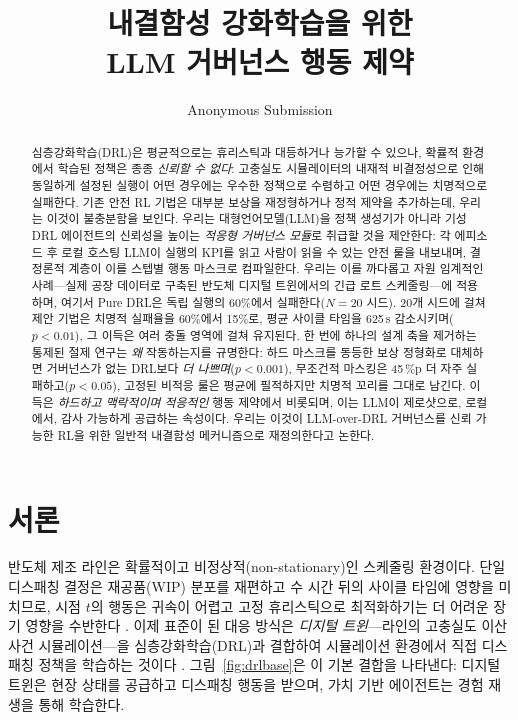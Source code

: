 \documentclass[letterpaper]{article} %
\title{내결함성 강화학습을 위한\\
LLM 거버넌스 행동 제약}
\author{
    Anonymous Submission
}
\begin{document}
\maketitle

\begin{abstract}
심층강화학습(DRL)은 평균적으로는 휴리스틱과 대등하거나 능가할 수 있으나, 확률적
환경에서 학습된 정책은 종종 \emph{신뢰할 수 없다}: 고충실도 시뮬레이터의 내재적
비결정성으로 인해 동일하게 설정된 실행이 어떤 경우에는 우수한 정책으로 수렴하고 어떤
경우에는 치명적으로 실패한다. 기존 안전 RL 기법은 대부분 보상을 재정형하거나 정적
제약을 추가하는데, 우리는 이것이 불충분함을 보인다. 우리는 대형언어모델(LLM)을 정책
생성기가 아니라 기성 DRL 에이전트의 신뢰성을 높이는 \emph{적응형 거버넌스 모듈}로
취급할 것을 제안한다: 각 에피소드 후 로컬 호스팅 LLM이 실행의 KPI를 읽고 사람이 읽을
수 있는 안전 룰을 내보내며, 결정론적 계층이 이를 스텝별 행동 마스크로 컴파일한다.
우리는 이를 까다롭고 자원 임계적인 사례---실제 공장 데이터로 구축된 반도체 디지털
트윈에서의 긴급 로트 스케줄링---에 적용하며, 여기서 Pure DRL은 독립 실행의 60\%에서
실패한다($N{=}20$ 시드). 20개 시드에 걸쳐 제안 기법은 치명적 실패율을 60\%에서
15\%로, 평균 사이클 타임을 625\,s 감소시키며($p{<}0.01$), 그 이득은 여러 충돌 영역에
걸쳐 유지된다. 한 번에 하나의 설계 축을 제거하는 통제된 절제 연구는 \emph{왜}
작동하는지를 규명한다: 하드 마스크를 동등한 보상 정형화로 대체하면 거버넌스가 없는
DRL보다 \emph{더 나쁘며}($p{<}0.001$), 무조건적 마스킹은 45\,\%p 더 자주
실패하고($p{<}0.05$), 고정된 비적응 룰은 평균에 필적하지만 치명적 꼬리를 그대로
남긴다. 이득은 \emph{하드하고 맥락적이며 적응적인} 행동 제약에서 비롯되며, 이는 LLM이
제로샷으로, 로컬에서, 감사 가능하게 공급하는 속성이다. 우리는 이것이 LLM-over-DRL
거버넌스를 신뢰 가능한 RL을 위한 일반적 내결함성 메커니즘으로 재정의한다고 논한다.
\end{abstract}

\section{서론}

반도체 제조 라인은 확률적이고 비정상적(non-stationary)인 스케줄링 환경이다. 단일
디스패칭 결정은 재공품(WIP) 분포를 재편하고 수 시간 뒤의 사이클 타임에 영향을
미치므로, 시점 $t$의 행동은 귀속이 어렵고 고정 휴리스틱으로 최적화하기는 더 어려운
장기 영향을 수반한다 \citep{moyne2017,hu2019}. 이제 표준이 된 대응 방식은
\emph{디지털 트윈}---라인의 고충실도 이산사건 시뮬레이션---을 심층강화학습(DRL)과
결합하여 시뮬레이션 환경에서 직접 디스패칭 정책을 학습하는 것이다
\citep{waschneck2018,lee2025}. 그림~\ref{fig:drlbase}은 이 기본 결합을 나타낸다:
디지털 트윈은 현장 상태를 공급하고 디스패칭 행동을 받으며, 가치 기반 에이전트는
경험 재생을 통해 학습한다.
\end{document}
